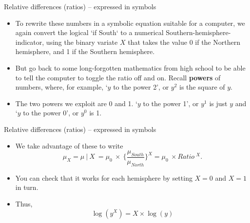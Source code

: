 \documentclass[10pt,handout]{beamer}\usepackage[]{graphicx}\usepackage[]{color}
\begin{document}
	\begin{frame}[fragile]{Relative differences (ratios) -- expressed in symbols}
			
		\begin{itemize}
			\item To rewrite these numbers in a symbolic equation suitable for a computer, we  again convert the logical `if South` to a numerical Southern-hemisphere-indicator, using the binary variate $X$ that takes the value 0 if the Northern hemisphere, and  1 if the Southern hemisphere.
			
			\item But go back to  some long-forgotten mathematics from high school to be able to tell the computer to toggle the ratio off and on. Recall \textbf{powers} of numbers, where, for example, 
			`$y$ to the power 2', or $y^2$ is the square of $y$. 
			
			\item The two powers we exploit are 0 and 1. `$y$ to the power 1', or $y^1$ is just $y$ and `$y$ to the power 0', or $y^0$ is 1.
			

		\end{itemize}
			
			
	\end{frame}
	
	
		\begin{frame}[fragile]{Relative differences (ratios) -- expressed in symbols}
		
		\begin{itemize}
	
			
			\item We take advantage of these to write
			$$\mu_X = \mu \ | \ X  \ = \mu_0 \ \times \  \Big\{ \frac{\mu_{South}}{\mu_{North}}\Big\}^X = \mu_0 \ \times Ratio \ ^ X.$$ 
			
			\item You can check that it works for each hemisphere by setting $X=0$ and $X=1$ in turn.
			
			\item Thus, $$\log(y^X) = X \times \log(y)$$  
		\end{itemize}
		
		
	\end{frame}
	
	
	
	
\end{document}
